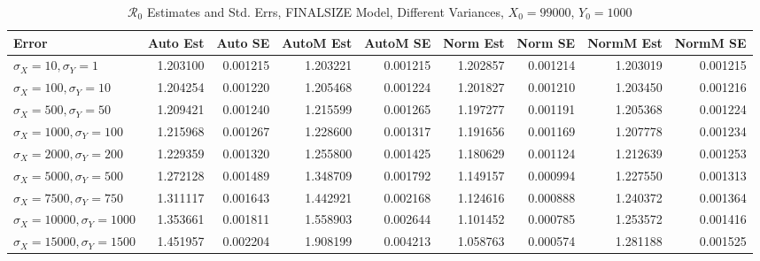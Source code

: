 \documentclass[12pt]{article}
\newcommand{\rr}{\ensuremath{\mathcal{R}_0}}
\begin{document}
\begin{table}[H]
	
	\caption{$\rr$ Estimates and Std. Errs, FINALSIZE Model, 
		Different Variances, $X_0 = 99000$, $Y_0 = 1000$}
	\begin{footnotesize}
		\hskip -1.7cm
		\begin{tabular}{l|r|r|r|r|r|r|r|r}
			\hline
			Error & Auto Est & Auto SE & AutoM Est & AutoM SE & Norm Est & Norm SE & NormM Est & NormM SE\\
			\hline
			$\sigma_X = 10, \sigma_Y = 1$ & 1.203100 & 0.001215 & 1.203221 & 0.001215 & 1.202857 & 0.001214 & 1.203019 & 0.001215\\
			\hline
			$\sigma_X = 100, \sigma_Y = 10$ & 1.204254 & 0.001220 & 1.205468 & 0.001224 & 1.201827 & 0.001210 & 1.203450 & 0.001216\\
			\hline
			$\sigma_X = 500, \sigma_Y = 50$ & 1.209421 & 0.001240 & 1.215599 & 0.001265 & 1.197277 & 0.001191 & 1.205368 & 0.001224\\
			\hline
			$\sigma_X = 1000, \sigma_Y = 100$ & 1.215968 & 0.001267 & 1.228600 & 0.001317 & 1.191656 & 0.001169 & 1.207778 & 0.001234\\
			\hline
			$\sigma_X = 2000, \sigma_Y = 200$ & 1.229359 & 0.001320 & 1.255800 & 0.001425 & 1.180629 & 0.001124 & 1.212639 & 0.001253\\
			\hline
			$\sigma_X = 5000, \sigma_Y = 500$ & 1.272128 & 0.001489 & 1.348709 & 0.001792 & 1.149157 & 0.000994 & 1.227550 & 0.001313\\
			\hline
			$\sigma_X = 7500, \sigma_Y = 750$ & 1.311117 & 0.001643 & 1.442921 & 0.002168 & 1.124616 & 0.000888 & 1.240372 & 0.001364\\
			\hline
			$\sigma_X = 10000, \sigma_Y = 1000$ & 1.353661 & 0.001811 & 1.558903 & 0.002644 & 1.101452 & 0.000785 & 1.253572 & 0.001416\\
			\hline
			$\sigma_X = 15000, \sigma_Y = 1500$ & 1.451957 & 0.002204 & 1.908199 & 0.004213 & 1.058763 & 0.000574 & 1.281188 & 0.001525\\
			\hline
		\end{tabular}
	\end{footnotesize}
\end{table}
\end{document}
